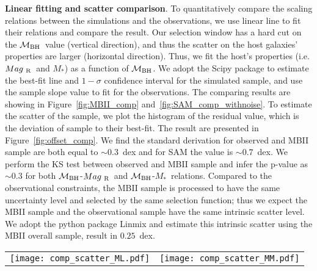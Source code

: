 \documentclass{natureprintstyle}
\newcommand{\mbh}{$\mathcal M_{\rm BH}$}
\newcommand{\mr}{$Mag_{\rm ~R}$}
\newcommand{\mstar}{{$M_*$}}
\begin{document}

\textbf{Linear fitting and scatter comparison}.  
To quantitatively compare the scaling relations between the simulations and the observations, we use linear line to fit their relations and compare the result. Our selection window has a hard cut on the \mbh\ value (vertical direction), and thus the scatter on the host galaxies' properties are larger (horizontal direction). Thus, we fit the host's properties (i.e. \mr\ and \mstar) as a function of \mbh. We adopt the {\sc Scipy} package to estimate the best-fit line and $1-\sigma$ confidence interval for the simulated sample, and use the sample slope value to fit for the observations. The comparing results are showing in Figure~\ref{fig:MBII_comp} and~\ref{fig:SAM_comp_withnoise}. To estimate the scatter of the sample, we plot the histogram of the residual value, which is the deviation of sample to their best-fit. The result are presented in Figure~\ref{fig:offset_comp}. We find the standard derivation for observed and MBII sample are both equal to $\sim0.3$~dex and for SAM the value is $\sim0.7$~dex.  We perform the KS test between observed and MBII sample and infer the p-value as $\sim0.3$ for both \mbh-\mr\ and \mbh-\mstar\ relations. Compared to the observational constraints, the MBII sample is processed to have the same uncertainty level and selected by the same selection function; thus we expect the MBII sample and the observational sample have the same intrinsic scatter level. We adopt the python package {\sc Linmix} and estimate this intrinsic scatter using the MBII overall sample, result in $0.25$~dex. 

\begin{figure*}[t]%
\begin{tabular}{c c}
\texttt{[image: comp\_scatter\_ML.pdf]} &
\texttt{[image: comp\_scatter\_MM.pdf]} \\
\end{tabular}
\caption{The histogram comparison of the scatter using residual value when fit as linear. The standard derivations for these distribution are $\sim0.3$~dex, $\sim0.3$~dex and $\sim0.7$~dex for observed sample, MBII sample and SAM sample, respectively. Compared to the observation and MBII, the horizontal scatters are much larger in SAM's prediction. 
}
\label{fig:offset_comp}
\end{figure*}
\end{document}

